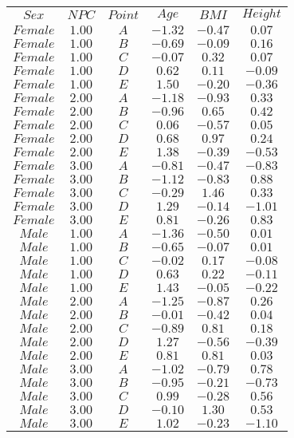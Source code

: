 \begin{tabular}{cccccc}
$Sex$ & $NPC$ & $Point$ & $Age$ & $BMI$ & $Height$\\
$Female$ & $1.00$ & $A$ & $-1.32$ & $-0.47$ & $0.07$\\
$Female$ & $1.00$ & $B$ & $-0.69$ & $-0.09$ & $0.16$\\
$Female$ & $1.00$ & $C$ & $-0.07$ & $0.32$ & $0.07$\\
$Female$ & $1.00$ & $D$ & $0.62$ & $0.11$ & $-0.09$\\
$Female$ & $1.00$ & $E$ & $1.50$ & $-0.20$ & $-0.36$\\
$Female$ & $2.00$ & $A$ & $-1.18$ & $-0.93$ & $0.33$\\
$Female$ & $2.00$ & $B$ & $-0.96$ & $0.65$ & $0.42$\\
$Female$ & $2.00$ & $C$ & $0.06$ & $-0.57$ & $0.05$\\
$Female$ & $2.00$ & $D$ & $0.68$ & $0.97$ & $0.24$\\
$Female$ & $2.00$ & $E$ & $1.38$ & $-0.39$ & $-0.53$\\
$Female$ & $3.00$ & $A$ & $-0.81$ & $-0.47$ & $-0.83$\\
$Female$ & $3.00$ & $B$ & $-1.12$ & $-0.83$ & $0.88$\\
$Female$ & $3.00$ & $C$ & $-0.29$ & $1.46$ & $0.33$\\
$Female$ & $3.00$ & $D$ & $1.29$ & $-0.14$ & $-1.01$\\
$Female$ & $3.00$ & $E$ & $0.81$ & $-0.26$ & $0.83$\\
$Male$ & $1.00$ & $A$ & $-1.36$ & $-0.50$ & $0.01$\\
$Male$ & $1.00$ & $B$ & $-0.65$ & $-0.07$ & $0.01$\\
$Male$ & $1.00$ & $C$ & $-0.02$ & $0.17$ & $-0.08$\\
$Male$ & $1.00$ & $D$ & $0.63$ & $0.22$ & $-0.11$\\
$Male$ & $1.00$ & $E$ & $1.43$ & $-0.05$ & $-0.22$\\
$Male$ & $2.00$ & $A$ & $-1.25$ & $-0.87$ & $0.26$\\
$Male$ & $2.00$ & $B$ & $-0.01$ & $-0.42$ & $0.04$\\
$Male$ & $2.00$ & $C$ & $-0.89$ & $0.81$ & $0.18$\\
$Male$ & $2.00$ & $D$ & $1.27$ & $-0.56$ & $-0.39$\\
$Male$ & $2.00$ & $E$ & $0.81$ & $0.81$ & $0.03$\\
$Male$ & $3.00$ & $A$ & $-1.02$ & $-0.79$ & $0.78$\\
$Male$ & $3.00$ & $B$ & $-0.95$ & $-0.21$ & $-0.73$\\
$Male$ & $3.00$ & $C$ & $0.99$ & $-0.28$ & $0.56$\\
$Male$ & $3.00$ & $D$ & $-0.10$ & $1.30$ & $0.53$\\
$Male$ & $3.00$ & $E$ & $1.02$ & $-0.23$ & $-1.10$\\
\end{tabular}
